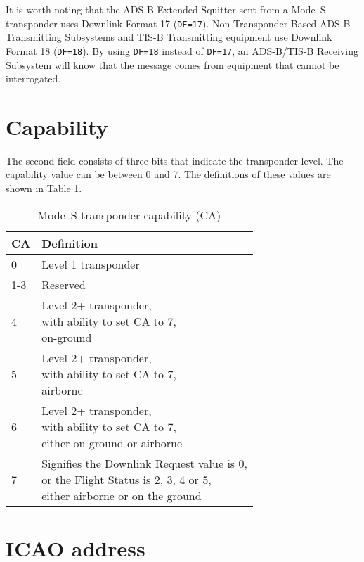 It is worth noting that the ADS-B Extended Squitter sent from a Mode~S transponder uses Downlink Format 17 (\texttt{DF=17}). Non-Transponder-Based ADS-B Transmitting Subsystems and TIS-B Transmitting equipment use Downlink Format 18 (\texttt{DF=18}). By using \texttt{DF=18} instead of \texttt{DF=17}, an ADS-B/TIS-B Receiving Subsystem will know that the message comes from equipment that cannot be interrogated.

\section{Capability}

The second field consists of three bits that indicate the transponder level. The capability value can be between 0 and 7. The definitions of these values are shown in Table \ref{tb:transponder_capability}.

\begin{table}[!ht]
\centering
\caption{Mode~S transponder capability (CA)}
\label{tb:transponder_capability}
\begin{tabular}{|l|p{10cm}|}
\hline
\textbf{CA} & \textbf{Definition} \\ \hline
0 & Level 1 transponder \\ \hline
1-3 & Reserved \\ \hline
4 & \makecell*{Level 2+ transponder, \\ with ability to set CA to 7, \\ on-ground} \\ \hline
5 & \makecell*{Level 2+ transponder, \\ with ability to set CA to 7, \\ airborne} \\ \hline
6 & \makecell*{Level 2+ transponder, \\ with ability to set CA to 7, \\ either on-ground or airborne} \\ \hline
7 & \makecell*{Signifies the Downlink Request value is 0, \\ or the Flight Status is 2, 3, 4 or 5, \\ either airborne or on the ground} \\ \hline
\end{tabular}
\end{table}

\section{ICAO address}


